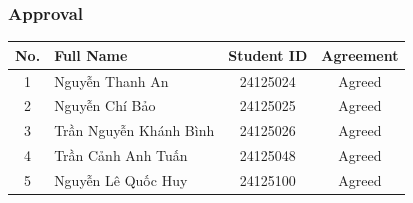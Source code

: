 \documentclass[12pt]{article}
\begin{document}
\subsubsection{Approval}

\begin{table}[H]
\centering
\begin{tabular}{|c|l|c|c|}
\hline
No. & Full Name & Student ID & Agreement \\
\hline
1 & Nguyễn Thanh An & 24125024 & Agreed \\
\hline
2 & Nguyễn Chí Bảo & 24125025 & Agreed \\
\hline
3 & Trần Nguyễn Khánh Bình & 24125026 & Agreed \\
\hline
4 & Trần Cảnh Anh Tuấn & 24125048 & Agreed \\
\hline
5 & Nguyễn Lê Quốc Huy & 24125100 & Agreed \\
\hline
\end{tabular}
\end{table}

\appendix

\end{document}
